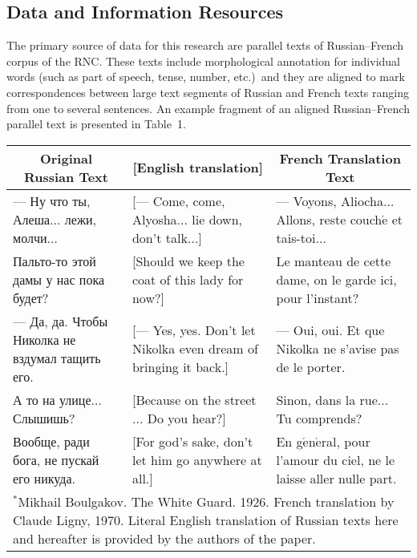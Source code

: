 \begin{multicols}{2}
  \section{Data and Information Resources}
  
\vspace*{-2pt}
  
  \noindent
  The primary source of data for this research are parallel texts of Russian--French 
corpus of the RNC. These texts include morphological annotation for individual 
words (such as part of speech, tense, number, etc.)\ and they are aligned to mark 
correspondences between large text segments of Russian and French texts ranging 
from one to several sentences. An example fragment of an aligned Russian--French 
parallel text is presented in\linebreak
 Table~1.
  
  \begin{table*}\small %
  \begin{center}
  \vspace*{2ex}
  
  \begin{tabular}{p{50mm}p{50mm}p{50mm}}
  \hline
\multicolumn{1}{c}{Original Russian Text}&\multicolumn{1}{c}{ [English 
translation]}&\multicolumn{1}{c}{French Translation Text}\\
\hline
--- Ну что ты, Алеша$\ldots$ лежи, молчи$\ldots$&[--- Come, come, Alyosha$\ldots$ lie down, 
don't talk$\ldots$]&--- Voyons, Aliocha$\ldots$ Allons, reste couch$\acute{\mbox{e}}$ 
et tais-toi$\ldots$\\
\hline
Пальто-то этой дамы у нас пока будет?&[Should we keep the coat of this lady for now?]&Le manteau de 
cette dame, on le garde ici, pour l'instant?\\
\hline
--- Да, да. Чтобы Николка не вздумал тащить его.&[--- Yes, yes. Don't let Nikolka even dream of 
bringing it back.]&--- Oui, oui. Et que Nikolka ne s'avise pas de le porter.\\
\hline
А то на улице$\ldots$ Слышишь? &[Because on the street$\ldots$ Do you hear?]&Sinon, dans la 
rue$\ldots$ Tu comprends? \\
\hline
Вообще, ради бога, не пускай его никуда.&[For god's sake, don't let him go anywhere at all.]&En 
g$\acute{\mbox{e}}$n$\acute{\mbox{e}}$ral, pour l'amour du ciel, ne le laisse aller nulle part.\\
  \hline
  \multicolumn{3}{p{156mm}}{\footnotesize \hspace*{2mm}$^*$Mikhail Boulgakov. 
The White Guard. 1926. French translation by Claude Ligny, 1970. Literal English translation of Russian 
texts here and hereafter is provided by the authors of the paper.}
  \end{tabular}
  \end{center}
  \vspace*{12pt}
  \end{table*}
  

\end{multicols}
